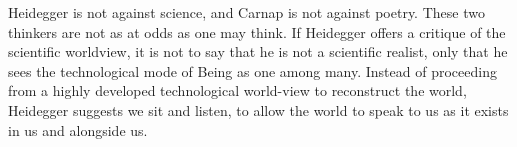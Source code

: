 \documentclass[leqno, 12pt]{turabian-researchpaper}
\begin{document}
	Heidegger is not against science, and Carnap is not against poetry. These two
	thinkers are not as at odds as one may think. If Heidegger offers a critique of
	the scientific worldview, it is not to say that he is not a scientific realist,
	only that he sees the technological mode of Being as one among many. Instead
	of proceeding from a highly developed technological world-view to reconstruct
	the world, Heidegger suggests we sit and listen, to allow the world to speak
	to us as it exists in us and alongside us.

	\printbibliography

	\centerline{}
\end{document}
